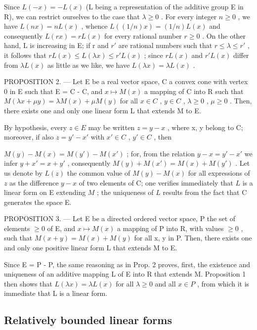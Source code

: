 Since \(L(-x) = -L(x)\) (L being a representation of the additive group E in R), we can restrict ourselves to the case that \(\lambda \geqslant 0\) . For every integer \(n \geqslant 0\) , we have \(L(nx) = nL(x)\) , whence \(L((1/n)x) = (1/n)L(x)\) and consequently \(L(rx) = rL(x)\) for every rational number \(r \geqslant 0\) . On the other hand, L is increasing in E; if r and \(r'\) are rational numbers such that \(r \leqslant \lambda \leqslant r'\) , it follows that \(rL(x) \leqslant L(\lambda x) \leqslant r'L(x)\) ; since \(rL(x)\) and \(r'L(x)\) differ from \(\lambda L(x)\) as little as we like, we have \(L(\lambda x) = \lambda L(x)\) .

PROPOSITION 2. --- Let E be a real vector space, C a convex cone with vertex 0 in E such that E = C - C, and \(x \mapsto M(x)\) a mapping of C into R such that \(M(\lambda x + \mu y) = \lambda M(x) + \mu M(y)\) for all \(x \in C\) , \(y \in C\) , \(\lambda \geqslant 0\) , \(\mu \geqslant 0\) . Then, there exists one and only one linear form L that extends M to E.

By hypothesis, every \(z \in E\) may be written \(z = y - x\) , where x, y belong to C; moreover, if also \(z = y' - x'\) with \(x' \in C\) , \(y' \in C\) , then

\(M(y) - M(x) = M(y') - M(x')\) ; for, from the relation \(y - x = y' - x'\) we infer \(y + x' = x + y'\) , consequently \(M(y) + M(x') = M(x) + M(y')\) . Let us denote by \(L(z)\) the common value of \(M(y) - M(x)\) for all expressions of \(z\) as the difference \(y - x\) of two elements of C; one verifies immediately that \(L\) is a linear form on E extending \(M\) ; the uniqueness of \(L\) results from the fact that C generates the space E.

PROPOSITION 3. --- Let E be a directed ordered vector space, P the set of elements \(\geqslant 0\) of E, and \(x \mapsto M(x)\) a mapping of P into R, with values \(\geqslant 0\) , such that \(M(x + y) = M(x) + M(y)\) for all x, y in P. Then, there exists one and only one positive linear form L that extends M to E.

Since E = P - P, the same reasoning as in Prop. 2 proves, first, the existence and uniqueness of an additive mapping L of E into R that extends M. Proposition 1 then shows that \(L(\lambda x) = \lambda L(x)\) for all \(\lambda \geqslant 0\) and all \(x \in P\) , from which it is immediate that L is a linear form.

\subsection{Relatively bounded linear forms}

